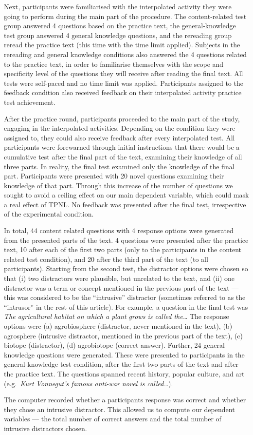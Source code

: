 Next, participants were familiarised with the interpolated activity they
were going to perform during the main part of the procedure. The
content-related test group answered 4 questions based on the practice
text, the general-knowledge test group answered 4 general knowledge
questions, and the rereading group reread the practice text (this time
with the time limit applied). Subjects in the rereading and general 
knowledge conditions also answered the 4 questions related to the
practice text, in order to familiarise themselves with the scope and
specificity level of the questions they will receive after reading the
final text. All tests were self-paced and no time limit was applied.
Participants assigned to the feedback condition also received feedback
on their interpolated activity practice test achievement.

After the practice round, participants proceeded to the 
main part of the study, engaging in the interpolated 
activities. Depending on the condition they were assigned 
to, they could also receive feedback after every 
interpolated test. All participants were forewarned through 
initial instructions that there 
would be a cumulative test after the final part of the 
text, examining their knowledge of all three parts. In 
reality, the final test examined only the knowledge of the 
final part. Participants were presented with 20 
novel questions examining their knowledge of that part. 
Through this  increase of the number of questions we sought 
to avoid a ceiling effect on our main dependent variable, 
which could mask a real effect of TPNL. No feedback was 
presented after the final test, irrespective of the 
experimental condition.

In total, 44 content related questions with 4 response options were 
generated from the presented parts of the text. 4 questions were presented 
after the practice text, 10 after each of the first two parts (only to the 
participants in the content related test condition), and 20 after the third 
part of the text (to all participants). Starting from the second test, the 
distractor options were chosen so that (i) two distractors were plausible, 
but unrelated to the text, and (ii) one distractor was a term or concept
mentioned in the previous part of the text --- this was considered to be
the ``intrusive'' distractor (sometimes referred to as the ``intrusor''
in the rest of this article). For example, a question in the final test
was \textit{The agricultural habitat on which a plant grows is called 
the\ldots} The response options were (a) agrobiosphere (distractor, never 
mentioned in the text), (b) agrosphere (intrusive distractor, mentioned in 
the previous part of the text), (c) biotope (distractor), (d) agrobiotope
(correct answer). Further, 24 general knowledge questions were generated. 
These were presented to participants in the general-knowledge test 
condition, after the first two parts of the text and after the practice 
text. The questions spanned recent history, popular culture, and art 
(e.g.~\textit{Kurt Vonnegut's famous anti-war novel is called\ldots}).

The computer recorded whether a participants response was correct and 
whether they chose an intrusive distractor. This allowed us to compute our 
dependent variables --- the total number of correct answers and the total 
number of intrusive distractors chosen.


